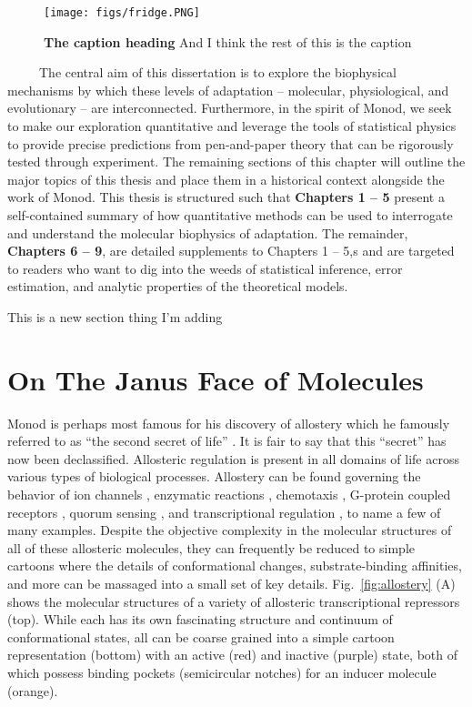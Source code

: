 \documentclass[12pt]{caltech_thesis}
\begin{document}
\hypertarget{fig:custom_second_figure}{%
\begin{figure}
\centering
\texttt{[image: figs/fridge.PNG]}
\caption[{The second first caption.}]{\textbf{The caption heading} And I
think the rest of this is the caption}
\label{fig:custom_second_figure}
\end{figure}
}

~~~~~The central aim of this dissertation is to explore the biophysical
mechanisms by which these levels of adaptation -- molecular,
physiological, and evolutionary -- are interconnected. Furthermore, in
the spirit of Monod, we seek to make our exploration quantitative and
leverage the tools of statistical physics to provide precise predictions
from pen-and-paper theory that can be rigorously tested through
experiment. The remaining sections of this chapter will outline the
major topics of this thesis and place them in a historical context
alongside the work of Monod. This thesis is structured such that
\textbf{Chapters 1 -- 5} present a self-contained summary of how
quantitative methods can be used to interrogate and understand the
molecular biophysics of adaptation. The remainder, \textbf{Chapters 6 --
9}, are detailed supplements to Chapters 1 -- 5,s and are targeted to
readers who want to dig into the weeds of statistical inference, error
estimation, and analytic properties of the theoretical models.

This is a new section thing I'm adding

\hypertarget{on-the-janus-face-of-molecules}{%
\section{On The Janus Face of
Molecules}\label{on-the-janus-face-of-molecules}}

Monod is perhaps most famous for his discovery of allostery which he
famously referred to as ``the second secret of life''
\autocite{ullmann2011,monod1965}. It is fair to say that this ``secret''
has now been declassified. Allosteric regulation is present in all
domains of life across various types of biological processes. Allostery
can be found governing the behavior of ion channels
\autocite{einav2017,auerbach2012}, enzymatic reactions
\autocite{einav2016}, chemotaxis \autocite{keymer2006}, G-protein
coupled receptors \autocite{canals2012}, quorum sensing
\autocite{swem2008}, and transcriptional regulation
\autocite{huang2018,lindsley2006a}, to name a few of many examples.
Despite the objective complexity in the molecular structures of all of
these allosteric molecules, they can frequently be reduced to simple
cartoons where the details of conformational changes, substrate-binding
affinities, and more can be massaged into a small set of key details.
Fig.~\ref{fig:allostery} (A) shows the molecular structures of a variety
of allosteric transcriptional repressors (top). While each has its own
fascinating structure and continuum of conformational states, all can be
coarse grained into a simple cartoon representation (bottom) with an
active (red) and inactive (purple) state, both of which possess binding
pockets (semicircular notches) for an inducer molecule (orange).
\end{document}
